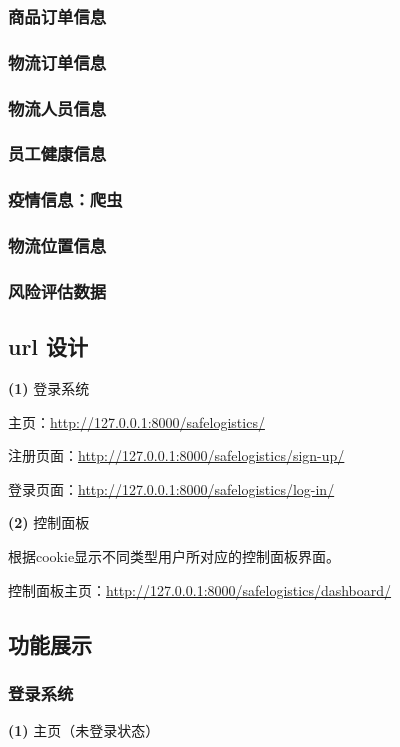 \documentclass[12pt]{article}
\begin{document}
\subsubsection{商品订单信息}
\subsubsection{物流订单信息}
\subsubsection{物流人员信息}
\subsubsection{员工健康信息}
\subsubsection{疫情信息：爬虫}
\subsubsection{物流位置信息}
\subsubsection{风险评估数据}

\subsection{url 设计}
\noindent \textbf{(1)} 登录系统 \par
主页：\url{http://127.0.0.1:8000/safelogistics/} \par 
注册页面：\url{http://127.0.0.1:8000/safelogistics/sign-up/} \par 
登录页面：\url{http://127.0.0.1:8000/safelogistics/log-in/} \par 
\noindent \textbf{(2)} 控制面板 \par
根据cookie显示不同类型用户所对应的控制面板界面。\par 
控制面板主页：\url{http://127.0.0.1:8000/safelogistics/dashboard/} \par 


\newpage
\subsection{功能展示}

\subsubsection{登录系统}
\noindent \textbf{(1)} 主页（未登录状态）
\end{document}
